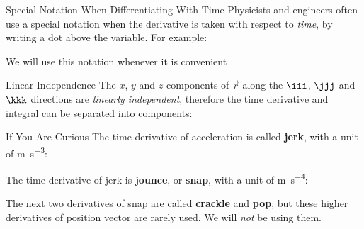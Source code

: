 \documentclass[12pt,compress,aspectratio=169,dvipsnames]{beamer}
\begin{document}
\begin{frame}{Special Notation When Differentiating With Time}
  Physicists and engineers often use a special notation when the derivative is
  taken with respect to \emph{time}, by writing a dot above the variable. For
  example:

  \vspace{-.3in}{\large
    \begin{align*}
      v &= \dot r \\
      a &= \dot v =\ddot r
    \end{align*}
  }

  We will use this notation whenever it is convenient
\end{frame}


\begin{frame}{Linear Independence}
  The $x$, $y$ and $z$ components of $\vec r$ along the $\iii$, $\jjj$ and
  $\kkk$ directions are \emph{linearly independent}, therefore the time
  derivative and integral can be separated into components:

\end{frame}



\begin{frame}{If You Are Curious}
  The time derivative of acceleration is called \textbf{jerk}, with a unit
  of \si{\metre\per\second\cubed}:


  The time derivative of jerk is \textbf{jounce}, or \textbf{snap}, with a
  unit of \si{\metre\per\second^4}:
  
  
  The next two derivatives of snap are called \textbf{crackle} and
  \textbf{pop}, but these higher derivatives of position vector are rarely used.
  We will \emph{not} be using them.
\end{frame}
\end{document}
